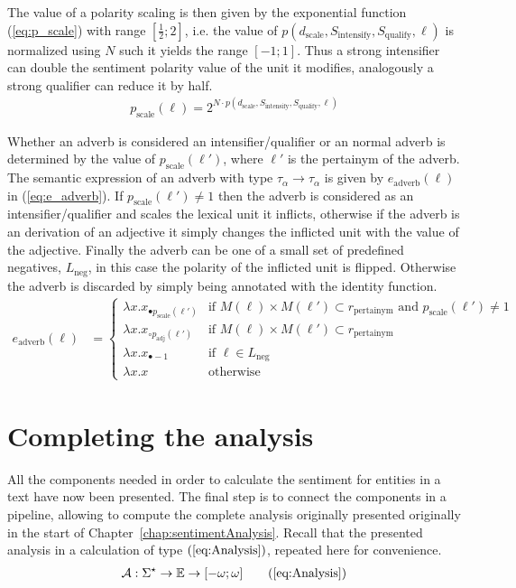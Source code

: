 The value of a polarity scaling is then given by the exponential function (\ref{eq:p_scale}) with range $\left[\frac{1}{2}; 2 \right]$, i.e. the value of $p(d_\mathrm{scale}, S_\mathrm{intensify}, S_\mathrm{qualify}, \ell)$ is normalized using $N$ such it yields the range $[-1; 1]$. Thus a strong intensifier can double the sentiment polarity value of the unit it modifies, analogously a strong qualifier can reduce it by half.  
\begin{align}
    p_\mathrm{scale}(\ell) = 2^{N \cdot p(d_\mathrm{scale}, S_\mathrm{intensify}, S_\mathrm{qualify}, \ell)}
    \label{eq:p_scale}
\end{align}

Whether an adverb is considered an intensifier/qualifier or an normal adverb is determined by the value of $p_\mathrm{scale}(\ell')$, where $\ell'$ is the pertainym of the adverb. The semantic expression of an adverb with type $\tau_\alpha \to \tau_\alpha$ is given by $e_\mathrm{adverb}(\ell)$ in (\ref{eq:e_adverb}). If $p_\mathrm{scale}(\ell') \neq 1$ then the adverb is considered as an intensifier/qualifier and scales the lexical unit it inflicts, otherwise if the adverb is an derivation of an adjective it simply changes the inflicted unit with the value of the adjective. Finally the adverb can be one of a small set of predefined negatives, $L_\mathrm{neg}$, in this case the polarity of the inflicted unit is flipped. Otherwise the adverb is discarded by simply being annotated with the identity function.
\begin{align}
	e_\mathrm{adverb}(\ell) &=
	\begin{cases}    
    \lambda x . x_{\bullet p_\mathrm{scale}(\ell')} & \text{if $M(\ell) \times M(\ell') \subset r_\mathrm{pertainym}$ and $p_\mathrm{scale}(\ell') \neq 1$} \\
    \lambda x . x_{\circ p_\mathrm{adj}(\ell')} & \text{if $M(\ell) \times M(\ell') \subset r_\mathrm{pertainym}$} \\
    \lambda x . x_{\bullet -1} & \text{if $\ell \in L_\mathrm{neg}$}\\
    \lambda x . x & \text{otherwise}
	\end{cases}
	\label{eq:e_adverb}
\end{align}

\section{Completing the analysis}
All the components needed in order to calculate the sentiment for entities in a text have now been presented. The final step is to connect the components in a pipeline, allowing to compute the complete analysis originally presented originally in the start of Chapter~\ref{chap:sentimentAnalysis}. Recall that the presented analysis in a calculation of type $(\ref{eq:Analysis})$, repeated here for convenience.
  \begin{align}
	 \mathcal{A}: \Sigma^\star \to \mathbb{E} \to [-\omega;\omega] \tag{\ref{eq:Analysis}}	 
  \end{align}

